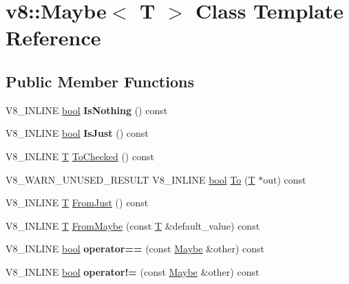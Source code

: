 \hypertarget{classv8_1_1Maybe}{}\section{v8\+:\+:Maybe$<$ T $>$ Class Template Reference}
\label{classv8_1_1Maybe}
\subsection*{Public Member Functions}
\begin{DoxyCompactItemize}
\item 
\mbox{\label{classv8_1_1Maybe_ae78f3cea1ba1913f81ca4f4751eb4f32}} 
V8\+\_\+\+I\+N\+L\+I\+NE \mbox{\hyperlink{classbool}{bool}} {\bfseries Is\+Nothing} () const
\item 
\mbox{\label{classv8_1_1Maybe_a9f9150acc7eefe3dcb20b073bacd740f}} 
V8\+\_\+\+I\+N\+L\+I\+NE \mbox{\hyperlink{classbool}{bool}} {\bfseries Is\+Just} () const
\item 
V8\+\_\+\+I\+N\+L\+I\+NE \mbox{\hyperlink{classv8_1_1internal_1_1torque_1_1T}{T}} \mbox{\hyperlink{classv8_1_1Maybe_abf2c0453c947f8c03f8e24b94887d33b}{To\+Checked}} () const
\item 
V8\+\_\+\+W\+A\+R\+N\+\_\+\+U\+N\+U\+S\+E\+D\+\_\+\+R\+E\+S\+U\+LT V8\+\_\+\+I\+N\+L\+I\+NE \mbox{\hyperlink{classbool}{bool}} \mbox{\hyperlink{classv8_1_1Maybe_a7d1d77e5fd55f125fb4c41db1335bd09}{To}} (\mbox{\hyperlink{classv8_1_1internal_1_1torque_1_1T}{T}} $\ast$out) const
\item 
V8\+\_\+\+I\+N\+L\+I\+NE \mbox{\hyperlink{classv8_1_1internal_1_1torque_1_1T}{T}} \mbox{\hyperlink{classv8_1_1Maybe_a6c35f4870a5b5049d09ba5f13c67ede9}{From\+Just}} () const
\item 
V8\+\_\+\+I\+N\+L\+I\+NE \mbox{\hyperlink{classv8_1_1internal_1_1torque_1_1T}{T}} \mbox{\hyperlink{classv8_1_1Maybe_a4b95361b73d9af3dddd975accca89a5f}{From\+Maybe}} (const \mbox{\hyperlink{classv8_1_1internal_1_1torque_1_1T}{T}} \&default\+\_\+value) const
\item 
\mbox{\label{classv8_1_1Maybe_aca04e8431f10cf8d335ee7aa4e64d9ac}} 
V8\+\_\+\+I\+N\+L\+I\+NE \mbox{\hyperlink{classbool}{bool}} {\bfseries operator==} (const \mbox{\hyperlink{classv8_1_1Maybe}{Maybe}} \&other) const
\item 
\mbox{\label{classv8_1_1Maybe_a3114cd0871d89142c15e0a3cd2d3c592}} 
V8\+\_\+\+I\+N\+L\+I\+NE \mbox{\hyperlink{classbool}{bool}} {\bfseries operator!=} (const \mbox{\hyperlink{classv8_1_1Maybe}{Maybe}} \&other) const
\end{DoxyCompactItemize}
